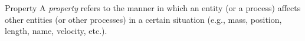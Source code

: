 \begin{definition}{Property} A \emph{property} refers to the manner in which an entity (or a process) affects other entities (or other processes) in a certain situation (e.g., mass, position, length, name, velocity, etc.).\end{definition}